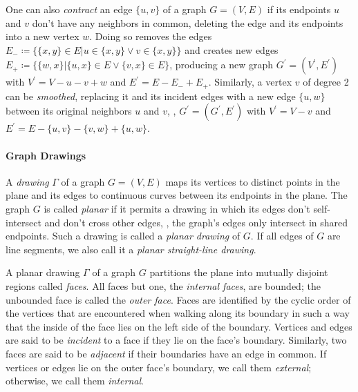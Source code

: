 One can also \emph{contract} an edge $\{u,v\}$ of a graph $G = (V, E)$ if its endpoints $u$ and $v$ don't have any neighbors in common, deleting the edge and  its endpoints into a new vertex $w$.
Doing so removes the edges $E_- \coloneqq \{ \{x,y\} \in E \vert u \in \{x,y\} \lor v \in \{x,y\} \}$ and creates new edges $E_+ \coloneqq \{ \{w,x\} \vert \{u,x\} \in E \lor \{v,x\} \in E \}$, producing a new graph $G^\prime = (V^\prime, E^\prime)$ with $V^\prime = V - u - v + w$ and $E^\prime = E - E_- + E_+$.
Similarly, a vertex $v$ of degree 2 can be \emph{smoothed}, replacing it and its incident edges with a new edge $\{u,w\}$ between its original neighbors $u$ and $v$, \ie{}, $G^\prime = (G^\prime, E^\prime)$ with $V^\prime = V - v$ and $E^\prime = E - \{u,v\} - \{v,w\} + \{u,w\}$.



\paragraph{Graph Drawings}


A \emph{drawing} $\Gamma$ of a graph $G = (V, E)$ maps its vertices to distinct points in the plane and its edges to continuous curves between its endpoints in the plane.
The graph $G$ is called \emph{planar} if it permits a drawing in which its edges don't self-intersect and don't cross other edges, \ie{}, the graph's edges only intersect in shared endpoints.
Such a drawing is called a \emph{planar drawing} of $G$.
If all edges of $G$ are line segments, we also call it a \emph{planar straight-line drawing}.

A planar drawing $\Gamma$ of a graph $G$ partitions the plane into mutually disjoint regions called \emph{faces}.
All faces but one, the \emph{internal faces}, are bounded; the unbounded face is called the \emph{outer face}.
Faces are identified by the cyclic order of the vertices that are encountered when walking along its boundary \cite{angelini2015monotone} in such a way that the inside of the face lies on the left side of the boundary.
Vertices and edges are said to be \emph{incident} to a face if they lie on the face's boundary.
Similarly, two faces are said to be \emph{adjacent} if their boundaries have an edge in common.
If vertices or edges lie on the outer face's boundary, we call them \emph{external}; otherwise, we call them \emph{internal}.


